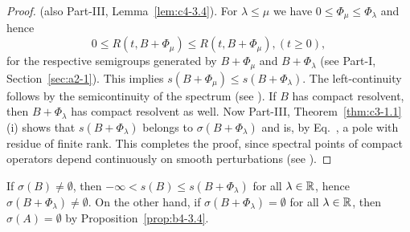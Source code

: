 \begin{proof} (\cf also Part-III, Lemma~\ref{lem:c4-3.4}). 
For $\lambda \leq \mu$ we have $0 \leq \Phi_\mu \leq \Phi_\lambda$ and hence 
\[
0 \leq R(t, B +\Phi_\mu) \leq R(t,B+\Phi_\mu) , (t\geq 0) , 
\]
for the respective semigroups generated by $B + \Phi_\mu$ and $B + \Phi_\lambda$ (see Part-I, Section~\ref{sec:a2-1}). 
This implies $s(B + \Phi_\mu) \leq s(B + \Phi_\lambda)$. 
The left-continuity follows by the semicontinuity of the spectrum (see \textcite[Chapter~IV, Theorem~3.1]{kato:1976}). 
If\/ $B$ has compact resolvent, then $B + \Phi_\lambda$ has compact resolvent as well. 
Now Part-III, Theorem~\ref{thm:c3-1.1}\,(i) shows that $s(B + \Phi_\lambda)$ belongs to $\sigma(B + \Phi_\lambda)$ and is, by Eq.~, a pole with residue of finite rank. 
This completes the proof, since spectral points of compact operators depend continuously on smooth perturbations (see \textcite[VII,6.Theorem~9]{dunfordschwartz:1958}).
\end{proof}
If\/ $\sigma(B) \neq \emptyset$, then $-\infty < s(B) \leq s(B + \Phi_\lambda)$ for all $\lambda \in \mathbb{R}$, 
hence $\sigma(B + \Phi_\lambda) \neq \emptyset$. 
On the other hand, if\/ $\sigma(B + \Phi_\lambda) = \emptyset$ for all $\lambda \in \mathbb{R}$,  then $\sigma(A) = \emptyset$ by Proposition~\ref{prop:b4-3.4}.

